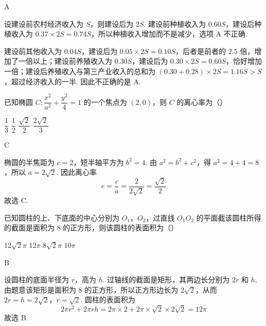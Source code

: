 \begin{answer}
A
\end{answer}

\begin{solution}
设建设前农村经济收入为 \(S\)，则建设后为 \(2S\). 建设前种植收入为 \(0.60S\)，建设后种植收入为 \(0.37\times2S=0.74S\)，所以种植收入增加而不是减少，选项 A 不正确.

建设前其他收入为 \(0.04S\)，建设后为 \(0.05\times2S=0.10S\)，后者是前者的 \(2.5\) 倍，增加了一倍以上；建设前养殖收入为 \(0.30S\)，建设后为 \(0.30\times2S=0.60S\)，恰好增加一倍；建设后养殖收入与第三产业收入的总和为 \((0.30+0.28)\times2S=1.16S>S\)，超过经济收入的一半. 因此不正确的是 A.
\end{solution}

\begin{problem}
已知椭圆 \(C:\dfrac{x^2}{a^2}+\dfrac{y^2}{4}=1\) 的一个焦点为 \((2,0)\)，则 \(C\) 的离心率为（\quad）

\choices
    {\(\dfrac13\)}
    {\(\dfrac12\)}
    {\(\dfrac{\sqrt2}{2}\)}
    {\(\dfrac{2\sqrt2}{3}\)}
\end{problem}

\begin{answer}
C
\end{answer}

\begin{solution}
椭圆的半焦距为 \(c=2\)，短半轴平方为 \(b^2=4\). 由 \(a^2=b^2+c^2\)，得 \(a^2=4+4=8\)，所以 \(a=2\sqrt2\). 因此离心率
\[
e=\frac ca=\frac{2}{2\sqrt2}=\frac{\sqrt2}{2}
\]
故选 C.
\end{solution}

\begin{problem}
已知圆柱的上、下底面的中心分别为 \(O_1\)，\(O_2\)，过直线 \(O_1O_2\) 的平面截该圆柱所得的截面是面积为 \(8\) 的正方形，则该圆柱的表面积为（\quad）

\choices
    {\(12\sqrt2\pi\)}
    {\(12\pi\)}
    {\(8\sqrt2\pi\)}
    {\(10\pi\)}
\end{problem}

\begin{answer}
B
\end{answer}

\begin{solution}
设圆柱的底面半径为 \(r\)，高为 \(h\). 过轴线的截面是矩形，其两边长分别为 \(2r\) 和 \(h\). 由题意该矩形是面积为 \(8\) 的正方形，所以正方形边长为 \(2\sqrt2\)，从而
\(2r=h=2\sqrt2\)，\(r=\sqrt2\).
圆柱的表面积为
\[
2\pi r^2+2\pi rh=2\pi\times2+2\pi\times\sqrt2\times2\sqrt2=12\pi
\]
故选 B.
\end{solution}

